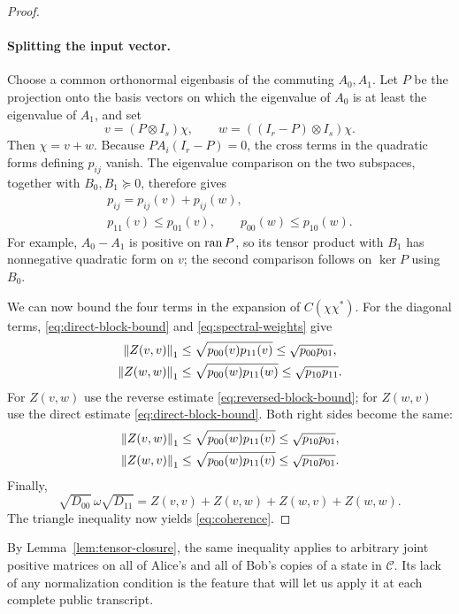 \begin{proof}
\paragraph{Splitting the input vector.}
Choose a common orthonormal eigenbasis of the commuting $A_0,A_1$.
Let $P$ be the projection onto the basis vectors on which the
eigenvalue of $A_0$ is at least the eigenvalue of $A_1$, and set
\[
 v=(P\otimes I_s)\chi,\qquad
 w=((I_r-P)\otimes I_s)\chi.
\]
Then $\chi=v+w$.  Because $PA_i(I_r-P)=0$, the cross terms in the
quadratic forms defining $p_{ij}$ vanish.  The eigenvalue comparison
on the two subspaces, together with $B_0,B_1\succeq0$, therefore gives
\begin{equation}\label{eq:spectral-weights}
 \begin{gathered}
 p_{ij}=p_{ij}(v)+p_{ij}(w),\\
 p_{11}(v)\le p_{01}(v),\qquad
 p_{00}(w)\le p_{10}(w).
 \end{gathered}
\end{equation}
For example, $A_0-A_1$ is positive on $\operatorname{ran} P$, so its tensor
product with $B_1$ has nonnegative quadratic form on $v$; the second
comparison follows on $\ker P$ using $B_0$.

We can now bound the four terms in the expansion of $C(\chi\chi^*)$.
For the diagonal terms, \eqref{eq:direct-block-bound} and
\eqref{eq:spectral-weights} give
\[
 \begin{aligned}
 \left\lVert Z(v,v)\right\rVert_1
 &\le\sqrt{p_{00}(v)p_{11}(v)}
  \le\sqrt{p_{00}p_{01}},\\
 \left\lVert Z(w,w)\right\rVert_1
 &\le\sqrt{p_{00}(w)p_{11}(w)}
  \le\sqrt{p_{10}p_{11}}.
 \end{aligned}
\]
For $Z(v,w)$ use the reverse estimate
\eqref{eq:reversed-block-bound}; for $Z(w,v)$ use the direct estimate
\eqref{eq:direct-block-bound}.  Both right sides become the same:
\[
 \begin{aligned}
 \left\lVert Z(v,w)\right\rVert_1&\le\sqrt{p_{00}(w)p_{11}(v)}
                       \le\sqrt{p_{10}p_{01}},\\
 \left\lVert Z(w,v)\right\rVert_1&\le\sqrt{p_{00}(w)p_{11}(v)}
                       \le\sqrt{p_{10}p_{01}}.
 \end{aligned}
\]
Finally,
\[
 \sqrt{D_{00}}\,\omega\sqrt{D_{11}}
 =Z(v,v)+Z(v,w)+Z(w,v)+Z(w,w).
\]
The triangle inequality now yields \eqref{eq:coherence}.
\end{proof}

By Lemma~\ref{lem:tensor-closure}, the same inequality applies to
arbitrary joint positive matrices on all of Alice's and all of Bob's
copies of a state in $\mathscr C$.  Its lack of any normalization
condition is the feature that will let us apply it at each complete
public transcript.
